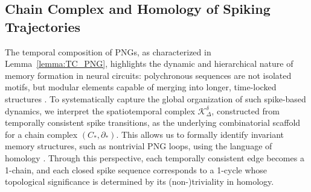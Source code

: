 \documentclass[lettersize,journal]{IEEEtran}
\begin{document}
\subsection{Chain Complex and Homology of Spiking Trajectories}

The temporal composition of PNGs, as characterized in Lemma~\ref{lemma:TC_PNG}, highlights the dynamic and hierarchical nature of memory formation in neural circuits: polychronous sequences are not isolated motifs, but modular elements capable of merging into longer, time-locked structures \cite{hasson2015hierarchical}. To systematically capture the global organization of such spike-based dynamics, we interpret the spatiotemporal complex \( \mathcal{K}_\Delta^\delta \), constructed from temporally consistent spike transitions, as the underlying combinatorial scaffold for a chain complex \( (C_*, \partial_*) \). This allows us to formally identify invariant memory structures, such as nontrivial PNG loops, using the language of homology \cite{hatcher2005algebraic}. Through this perspective, each temporally consistent edge becomes a 1-chain, and each closed spike sequence corresponds to a 1-cycle whose topological significance is determined by its (non-)triviality in homology.
\end{document}
